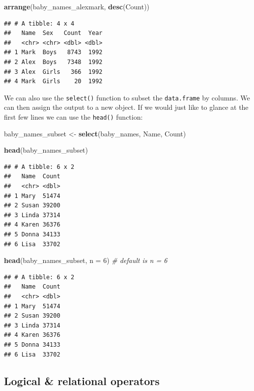 \documentclass[
]{book}
\newenvironment{Shaded}{\begin{snugshade}}{\end{snugshade}}
\newcommand{\CommentTok}[1]{\textcolor[rgb]{0.56,0.35,0.01}{\textit{#1}}}
\newcommand{\DataTypeTok}[1]{\textcolor[rgb]{0.13,0.29,0.53}{#1}}
\newcommand{\DecValTok}[1]{\textcolor[rgb]{0.00,0.00,0.81}{#1}}
\newcommand{\KeywordTok}[1]{\textcolor[rgb]{0.13,0.29,0.53}{\textbf{#1}}}
\newcommand{\NormalTok}[1]{#1}
\newcommand{\StringTok}[1]{\textcolor[rgb]{0.31,0.60,0.02}{#1}}
\begin{document}
\begin{Shaded}
\begin{Highlighting}[]
\KeywordTok{arrange}\NormalTok{(baby_names_alexmark, }\KeywordTok{desc}\NormalTok{(Count))}
\end{Highlighting}
\end{Shaded}

\begin{verbatim}
## # A tibble: 4 x 4
##   Name  Sex   Count  Year
##   <chr> <chr> <dbl> <dbl>
## 1 Mark  Boys   8743  1992
## 2 Alex  Boys   7348  1992
## 3 Alex  Girls   366  1992
## 4 Mark  Girls    20  1992
\end{verbatim}

We can also use the \texttt{select()} function to subset the \texttt{data.frame}
by columns. We can then assign the output to a new object. If we
would just like to glance at the first few lines we can use the
\texttt{head()} function:

\begin{Shaded}
\begin{Highlighting}[]
\NormalTok{baby_names_subset <-}\StringTok{ }\KeywordTok{select}\NormalTok{(baby_names, Name, Count)}

\KeywordTok{head}\NormalTok{(baby_names_subset)}
\end{Highlighting}
\end{Shaded}

\begin{verbatim}
## # A tibble: 6 x 2
##   Name  Count
##   <chr> <dbl>
## 1 Mary  51474
## 2 Susan 39200
## 3 Linda 37314
## 4 Karen 36376
## 5 Donna 34133
## 6 Lisa  33702
\end{verbatim}

\begin{Shaded}
\begin{Highlighting}[]
\KeywordTok{head}\NormalTok{(baby_names_subset, }\DataTypeTok{n =} \DecValTok{6}\NormalTok{) }\CommentTok{# default is n = 6}
\end{Highlighting}
\end{Shaded}

\begin{verbatim}
## # A tibble: 6 x 2
##   Name  Count
##   <chr> <dbl>
## 1 Mary  51474
## 2 Susan 39200
## 3 Linda 37314
## 4 Karen 36376
## 5 Donna 34133
## 6 Lisa  33702
\end{verbatim}

\hypertarget{logical-relational-operators}{%
\subsection{Logical \& relational operators}\label{logical-relational-operators}}
\end{document}
